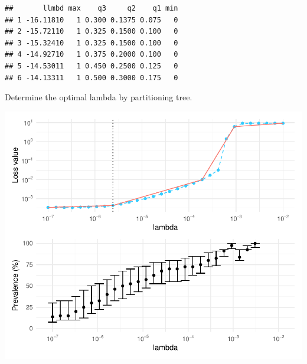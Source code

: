 \documentclass[
]{article}
\newenvironment{Shaded}{\begin{snugshade}}{\end{snugshade}}
\newcommand{\AttributeTok}[1]{\textcolor[rgb]{0.13,0.29,0.53}{#1}}
\newcommand{\DecValTok}[1]{\textcolor[rgb]{0.00,0.00,0.81}{#1}}
\newcommand{\FunctionTok}[1]{\textcolor[rgb]{0.13,0.29,0.53}{\textbf{#1}}}
\newcommand{\NormalTok}[1]{#1}
\newcommand{\OtherTok}[1]{\textcolor[rgb]{0.56,0.35,0.01}{#1}}
\newcommand{\SpecialCharTok}[1]{\textcolor[rgb]{0.81,0.36,0.00}{\textbf{#1}}}
\begin{document}
\begin{Shaded}
\end{Shaded}

\begin{verbatim}
##       llmbd max    q3     q2    q1 min
## 1 -16.11810   1 0.300 0.1375 0.075   0
## 2 -15.72110   1 0.325 0.1500 0.100   0
## 3 -15.32410   1 0.325 0.1500 0.100   0
## 4 -14.92710   1 0.375 0.2000 0.100   0
## 5 -14.53011   1 0.450 0.2500 0.125   0
## 6 -14.13311   1 0.500 0.3000 0.175   0
\end{verbatim}

Determine the optimal lambda by partitioning tree.

\begin{Shaded}
\end{Shaded}

\includegraphics{workshop_files/figure-latex/unnamed-chunk-46-1.pdf}
\end{document}
